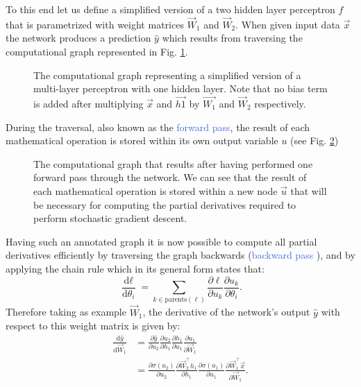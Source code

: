 To this end let us define a simplified version of a two hidden layer perceptron $f$ that is parametrized with weight matrices $\vec{W}_1$ and $\vec{W}_2$. When given input data $\vec{x}$ the network produces a prediction $\hat{y}$ which results from traversing the computational graph represented in Fig. \ref{fig:computational_graph_1}.  
\begin{figure}[ht!]
	\centering
	
	\caption{The computational graph representing a simplified version of a multi-layer perceptron with one hidden layer. Note that no bias term is added after multiplying $\vec{x}$ and $\vec{h1}$ by $\vec{W_1}$ and $\vec{W}_2$ respectively.}
\label{fig:computational_graph_1}
\end{figure}
During the traversal, also known as the \textcolor{RoyalBlue}{forward pass}, the result of each mathematical operation is stored within its own output variable $u$ (see Fig. \ref{fig:computational_graph_2}) 
\begin{figure}[ht!]
	\centering
	
	\caption{The computational graph that results after having performed one forward pass through the network. We can see that the result of each mathematical operation is stored within a new node $\vec{u}$ that will be necessary for computing the partial derivatives required to perform stochastic gradient descent.}
\label{fig:computational_graph_2}
\end{figure}
Having such an annotated graph it is now possible to compute all partial derivatives efficiently by traversing the graph backwards (\textcolor{RoyalBlue}{backward pass} \cite{linnainmaa1970representation}), and by applying the chain rule which in its general form states that:
\begin{equation}
	\frac{\text{d} \ell}{\text{d} \theta_i} = \sum_{k\in\text{parents}(\ell)} \frac{\partial \ell}{\partial u_k} \frac{\partial u_k}{\partial \theta_i}.
\end{equation}
Therefore taking as example $\vec{W}_1$, the derivative of the network's output $\hat{y}$ with respect to this weight matrix is given by:
\label{eq:general_chain_rule}
\begin{equation}
	\begin{split}
		\frac{\text{d} \hat{y}}{\text{d} \vec{W}_1} & = \frac{\partial \hat{y}}{\partial u_2} \frac{\partial u_2}{\partial h_1} \frac{\partial h_1}{\partial u_1} \frac{\partial u_1}{\partial\vec{W}_1} \\
	& = \frac{\partial\sigma(u_2)}{\partial u_2} \frac{\partial\vec{W}_2^{\intercal}h_1}{\partial h_1} \frac{\partial \sigma(u_1)}{\partial u_1} \frac{\partial \vec{W}_1^{\intercal}\vec{x}}{\partial{\vec{W}_1}}.
	\end{split}
	\label{eq:applied_chain_rule}
\end{equation}

